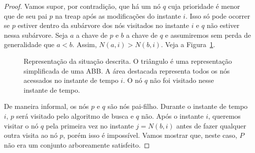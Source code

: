 \begin{proof}
Vamos supor, por contradição, que há um nó $q$ cuja prioridade é menor que de seu pai $p$ na treap após as modificações do instante $i$. Isso só pode ocorrer se $p$ estiver dentro da subárvore dos nós visitados no instante $i$ e $q$ não estiver nessa subárvore. Seja $a$ a chave de $p$ e $b$ a chave de $q$ e assumiremos sem perda de generalidade que $a < b$. Assim, $N(a,i) > N(b,i)$. Veja a Figura~\ref{fig:representacao_grafica}.


\begin{figure}[H]
    \caption{Representação da situação descrita. O triângulo é uma representação simplificada de uma ABB. A área destacada representa todos os nós acessados no instante de tempo $i$. O nó $q$ não foi visitado nesse instante de tempo.}
\label{fig:representacao_grafica}
\end{figure}
De maneira informal, os nós $p$ e $q$ são nós pai-filho. Durante o instante de tempo $i$, $p$ será visitado pelo algoritmo de busca e $q$ não. Após o instante $i$, queremos visitar o nó $q$ pela primeira vez no instante $j = N(b,i)$ antes de fazer qualquer outra visita ao nó $p$, porém isso é impossível. Vamos mostrar que, neste caso, $P$ não era um conjunto arboreamente satisfeito.


\end{proof}

